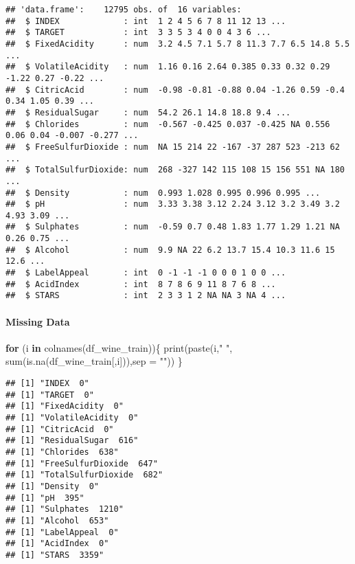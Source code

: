 \documentclass[
]{article}
\newenvironment{Shaded}{\begin{snugshade}}{\end{snugshade}}
\newcommand{\AttributeTok}[1]{\textcolor[rgb]{0.77,0.63,0.00}{#1}}
\newcommand{\ControlFlowTok}[1]{\textcolor[rgb]{0.13,0.29,0.53}{\textbf{#1}}}
\newcommand{\FunctionTok}[1]{\textcolor[rgb]{0.00,0.00,0.00}{#1}}
\newcommand{\NormalTok}[1]{#1}
\newcommand{\StringTok}[1]{\textcolor[rgb]{0.31,0.60,0.02}{#1}}
\begin{document}
\begin{verbatim}
## 'data.frame':    12795 obs. of  16 variables:
##  $ INDEX             : int  1 2 4 5 6 7 8 11 12 13 ...
##  $ TARGET            : int  3 3 5 3 4 0 0 4 3 6 ...
##  $ FixedAcidity      : num  3.2 4.5 7.1 5.7 8 11.3 7.7 6.5 14.8 5.5 ...
##  $ VolatileAcidity   : num  1.16 0.16 2.64 0.385 0.33 0.32 0.29 -1.22 0.27 -0.22 ...
##  $ CitricAcid        : num  -0.98 -0.81 -0.88 0.04 -1.26 0.59 -0.4 0.34 1.05 0.39 ...
##  $ ResidualSugar     : num  54.2 26.1 14.8 18.8 9.4 ...
##  $ Chlorides         : num  -0.567 -0.425 0.037 -0.425 NA 0.556 0.06 0.04 -0.007 -0.277 ...
##  $ FreeSulfurDioxide : num  NA 15 214 22 -167 -37 287 523 -213 62 ...
##  $ TotalSulfurDioxide: num  268 -327 142 115 108 15 156 551 NA 180 ...
##  $ Density           : num  0.993 1.028 0.995 0.996 0.995 ...
##  $ pH                : num  3.33 3.38 3.12 2.24 3.12 3.2 3.49 3.2 4.93 3.09 ...
##  $ Sulphates         : num  -0.59 0.7 0.48 1.83 1.77 1.29 1.21 NA 0.26 0.75 ...
##  $ Alcohol           : num  9.9 NA 22 6.2 13.7 15.4 10.3 11.6 15 12.6 ...
##  $ LabelAppeal       : int  0 -1 -1 -1 0 0 0 1 0 0 ...
##  $ AcidIndex         : int  8 7 8 6 9 11 8 7 6 8 ...
##  $ STARS             : int  2 3 3 1 2 NA NA 3 NA 4 ...
\end{verbatim}

\hypertarget{missing-data-1}{%
\paragraph{Missing Data}\label{missing-data-1}}

\begin{Shaded}
\begin{Highlighting}[]
\ControlFlowTok{for}\NormalTok{ (i }\ControlFlowTok{in} \FunctionTok{colnames}\NormalTok{(df\_wine\_train))\{}
  \FunctionTok{print}\NormalTok{(}\FunctionTok{paste}\NormalTok{(i,}\StringTok{"  "}\NormalTok{, }\FunctionTok{sum}\NormalTok{(}\FunctionTok{is.na}\NormalTok{(df\_wine\_train[,i])),}\AttributeTok{sep =} \StringTok{""}\NormalTok{))}
\NormalTok{\}}
\end{Highlighting}
\end{Shaded}

\begin{verbatim}
## [1] "INDEX  0"
## [1] "TARGET  0"
## [1] "FixedAcidity  0"
## [1] "VolatileAcidity  0"
## [1] "CitricAcid  0"
## [1] "ResidualSugar  616"
## [1] "Chlorides  638"
## [1] "FreeSulfurDioxide  647"
## [1] "TotalSulfurDioxide  682"
## [1] "Density  0"
## [1] "pH  395"
## [1] "Sulphates  1210"
## [1] "Alcohol  653"
## [1] "LabelAppeal  0"
## [1] "AcidIndex  0"
## [1] "STARS  3359"
\end{verbatim}
\end{document}
